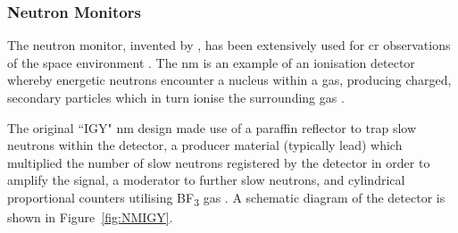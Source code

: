 \subsubsection*{Neutron Monitors}
The neutron monitor, invented by \cite{simpson_latitude_1948}, has been extensively used for \gls{cr} observations of the space environment \citep{clem_neutron_2000}. The \gls{nm} is an example of an ionisation detector whereby energetic neutrons encounter a nucleus within a gas, producing charged, secondary particles which in turn ionise the surrounding gas \citep{gloeckler_-situ_2010}.

The original ``IGY" \gls{nm} design made use of a paraffin reflector to trap slow neutrons within the detector, a producer material (typically lead) which multiplied the number of slow neutrons registered by the detector in order to amplify the signal, a moderator to further slow neutrons, and cylindrical proportional counters utilising BF\textsubscript{3} gas \citep{simpson_latitude_1948, simpson_cosmic_1953}. A schematic diagram of the detector is shown in Figure~\ref{fig:NMIGY}. %

